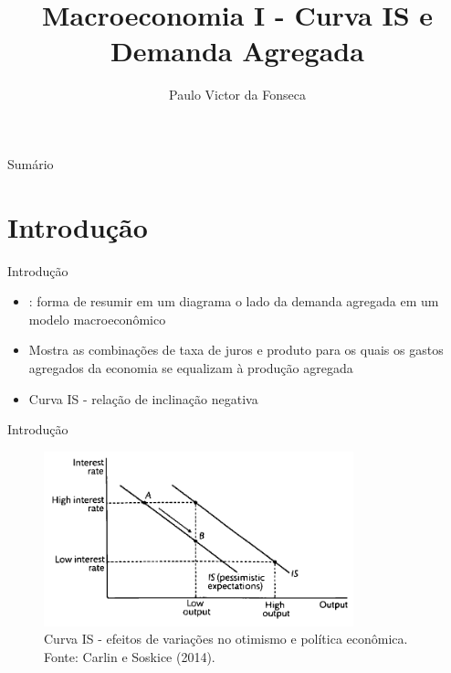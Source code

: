 \documentclass[10pt]{beamer}
\title[]{Macroeconomia I - Curva IS e Demanda Agregada}
\author[]{Paulo Victor da Fonseca}
\date{}
\begin{document}
\begin{frame}[plain]
\end{frame}

\begin{frame}{Sumário}
    \tableofcontents
\end{frame}

\section{Introdução}
\begin{frame}{Introdução}
    \begin{itemize}
        \item {}: forma de resumir em um diagrama o lado da demanda agregada em um modelo macroeconômico\bigskip

        \item Mostra as combinações de taxa de juros e produto para os quais os gastos agregados da economia se equalizam à produção agregada\bigskip

        \item Curva IS - relação de inclinação negativa
    \end{itemize}
\end{frame}

\begin{frame}{Introdução}    
    \begin{figure}
        \centering
        \includegraphics[width=0.8\textwidth]{./figures/aula6_fig1.PNG}
        \caption{Curva IS - efeitos de variações no otimismo e política econômica. Fonte: Carlin e Soskice (2014).}
        \label{aula6_fig1}
    \end{figure}
\end{frame}
\end{document}
